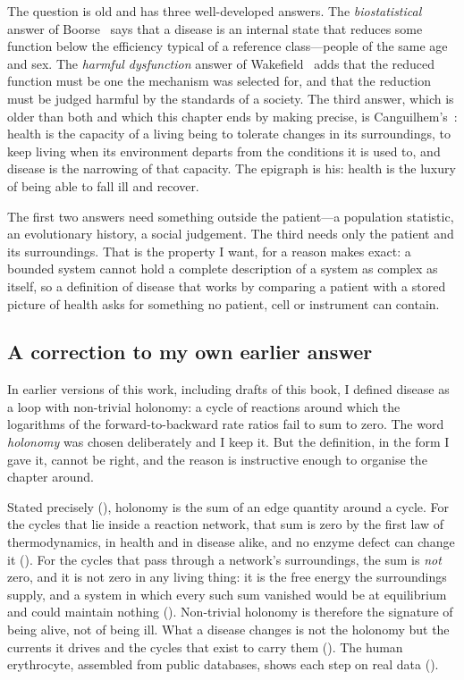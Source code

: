 The question is old and has three well-developed answers. The
\emph{biostatistical} answer of Boorse~\citep{boorse1977} says that a
disease is an internal state that reduces some function below the efficiency
typical of a reference class---people of the same age and sex. The
\emph{harmful dysfunction} answer of Wakefield~\citep{wakefield1992} adds
that the reduced function must be one the mechanism was selected for, and
that the reduction must be judged harmful by the standards of a society.
The third answer, which is older than both and which this chapter ends by
making precise, is Canguilhem's~\citep{canguilhem1989}: health is the
capacity of a living being to tolerate changes in its surroundings, to keep
living when its environment departs from the conditions it is used to, and
disease is the narrowing of that capacity. The epigraph is his: health is
the luxury of being able to fall ill and recover.

The first two answers need something outside the patient---a population
statistic, an evolutionary history, a social judgement. The third needs only
the patient and its surroundings. That is the property I want, for a reason
 makes exact: a bounded system cannot hold a complete
description of a system as complex as itself, so a definition of disease
that works by comparing a patient with a stored picture of health asks for
something no patient, cell or instrument can contain.

\subsection*{A correction to my own earlier answer}

In earlier versions of this work, including drafts of this book, I defined
disease as a loop with non-trivial holonomy: a cycle of reactions around
which the logarithms of the forward-to-backward rate ratios fail to sum to
zero. The word \emph{holonomy} was chosen deliberately and I keep it. But
the definition, in the form I gave it, cannot be right, and the reason is
instructive enough to organise the chapter around.

Stated precisely (), holonomy is the sum of an
edge quantity around a cycle. For the cycles that lie inside a reaction
network, that sum is zero by the first law of thermodynamics, in health and
in disease alike, and no enzyme defect can change it
(). For the cycles that pass through a network's
surroundings, the sum is \emph{not} zero, and it is not zero in any living
thing: it is the free energy the surroundings supply, and a system in which
every such sum vanished would be at equilibrium and could maintain nothing
(). Non-trivial holonomy is
therefore the signature of being alive, not of being ill. What a disease
changes is not the holonomy but the currents it drives and the cycles that
exist to carry them (). The human
erythrocyte, assembled from public databases, shows each step on real data
().

